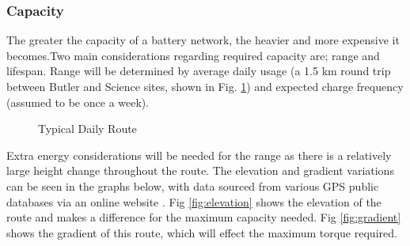 \documentclass[journal,10pt]{IEEEtran}
\begin{document}
        \subsubsection{Capacity}
            The greater the capacity of a battery network, the heavier and more expensive it becomes.Two main considerations regarding required capacity are; range and lifespan. Range will be determined by average daily usage (a 1.5 km round trip between Butler and Science sites, shown in Fig. \ref{fig:route}) and expected charge frequency (assumed to be once a week).
            \begin{figure}[H]
                \centering
                \caption{Typical Daily Route}
                \label{fig:route}
            \end{figure}
            Extra energy considerations will be needed for the range as there is a relatively large height change throughout the route.
            The elevation and gradient variations can be seen in the graphs below, with data sourced from various GPS public databases via an online website \cite{GPSDatabase}.
            Fig \ref{fig:elevation} shows the elevation of the route and makes a difference for the maximum capacity needed.
            Fig \ref{fig:gradient} shows the gradient of this route, which will effect the maximum torque required.
\end{document}
